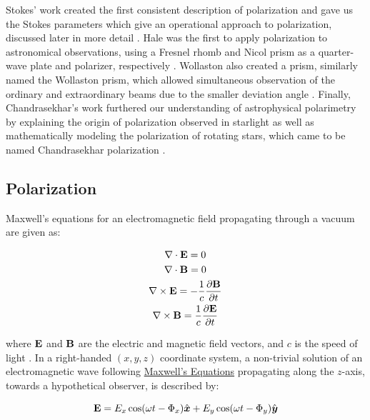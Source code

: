 Stokes' work created the first consistent description of polarization and gave us the Stokes parameters which give an operational approach to polarization, discussed later in more detail \citep{Stokes}. Hale was the first to apply polarization to astronomical observations, using a Fresnel rhomb and Nicol prism as a quarter-wave plate and polarizer, respectively \citep{Hale_pre,Hale_post}. Wollaston also created a prism, similarly named the Wollaston prism, which allowed simultaneous observation of the ordinary and extraordinary beams due to the smaller deviation angle \citep{WollPrism}. Finally, Chandrasekhar's work furthered our understanding of astrophysical polarimetry by explaining the origin of polarization observed in starlight as well as mathematically modeling the polarization of rotating stars, which came to be named Chandrasekhar polarization \citep{chandrasekhar}.

\subsection{Polarization}

Maxwell's equations for an electromagnetic field propagating through a vacuum are given as:

\begin{equation}
    \begin{gathered}
        \nabla \cdot \mathbf{E} = 0 \\
        \nabla \cdot \mathbf{B} = 0 \\
        \nabla \times \mathbf{E} = - \frac{1}{c} \frac{\partial \mathbf{B}}{\partial t} \\
        \nabla \times \mathbf{B} = \frac{1}{c} \frac{\partial \mathbf{E}}{\partial t}
    \end{gathered}
    \label{eq:Maxwell}
\end{equation}

\noindent where $\mathbf{E}$ and $\mathbf{B}$ are the electric and magnetic field vectors, and $c$ is the speed of light \citep{Griffiths}. In a right-handed $(x, y, z)$ coordinate system, a non-trivial solution of an electromagnetic wave following \hyperref[eq:Maxwell]{Maxwell's Equations} propagating along the $z$-axis, towards a hypothetical observer, is described by:

\begin{equation}
    \mathbf{E} = E_{x} \cos(\omega t - \Phi_{x}) \hat{\boldsymbol{x}} +
    E_{y} \cos(\omega t - \Phi_{y}) \hat{\boldsymbol{y}}
    \label{eq:Maxwell_sol}
\end{equation}

